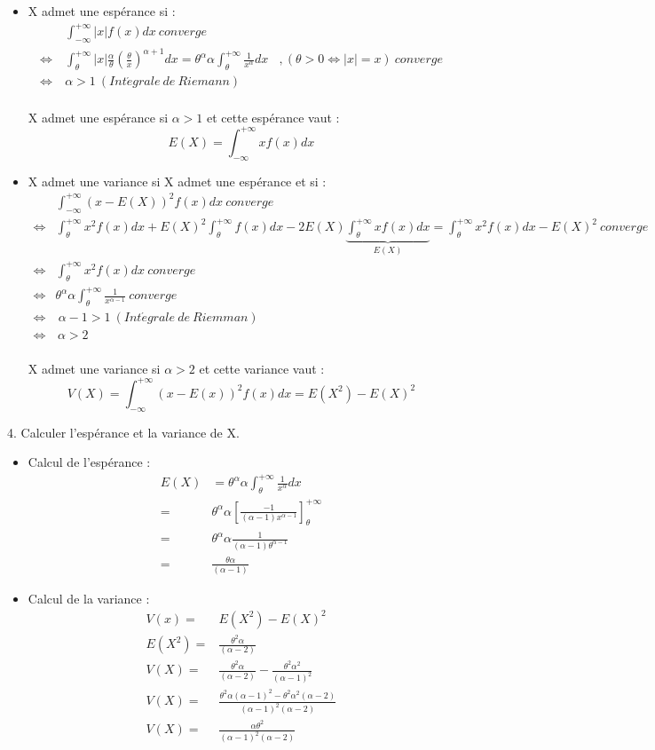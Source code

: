 \documentclass{article}
\begin{document}
\begin{itemize}
\item X admet une espérance si :
\begin{align*}
 & \int_{-\infty}^{+\infty}|x|f(x)dx\ converge\\
\Leftrightarrow & \int_{\theta}^{+\infty}|x|\frac{\alpha}{\theta}(\frac{\theta}{x})^{\alpha+1}dx=\theta^{\alpha}\alpha\int_{\theta}^{+\infty}\frac{1}{x^{\alpha}}dx\ \ \ \ ,(\theta>0\Leftrightarrow|x|=x)\ converge\\
\Leftrightarrow\  & \alpha>1\ (Int\acute{e}grale\ de\ Riemann)
\end{align*}
\\
X admet une espérance si $\alpha>1$ et cette espérance vaut :\\
\[
E(X)=\int_{-\infty}^{+\infty}xf(x)dx
\]
\item X admet une variance si X admet une espérance et si :
\begin{align*}
 & \int_{-\infty}^{+\infty}(x-E(X))^{2}f(x)dx\ converge\\
\Leftrightarrow & \int_{\theta}^{+\infty}x^{2}f(x)dx+E(X)^{2}\int_{\theta}^{+\infty}f(x)dx-2E(X)\underset{E(X)}{\underbrace{\int_{\theta}^{+\infty}xf(x)dx}}=\int_{\theta}^{+\infty}x^{2}f(x)dx-E(X)^{2}\ converge\\
\Leftrightarrow & \int_{\theta}^{+\infty}x^{2}f(x)dx\ converge\\
\Leftrightarrow & \theta^{\alpha}\alpha\int_{\theta}^{+\infty}\frac{1}{x^{\alpha-1}}\ converge\\
\Leftrightarrow & \ \alpha-1>1\ (Int\acute{e}grale\ de\ Riemman)\\
\Leftrightarrow & \,\alpha>2
\end{align*}
\\
X admet une variance si $\alpha>2$ et cette variance vaut :
\[
V(X)=\int_{-\infty}^{+\infty}(x-E(x))^{2}f(x)dx=E(X^{2})-E(X)^{2}
\]
\end{itemize}
4. Calculer l'espérance et la variance de X.
\begin{itemize}
\item Calcul de l'espérance :
\begin{align*}
E(X) & =\theta^{\alpha}\alpha\int_{\theta}^{+\infty}\frac{1}{x^{\alpha}}dx\\
= & \theta^{\alpha}\alpha[\frac{-1}{(\alpha-1)x^{\alpha-1}}]_{\theta}^{+\infty}\\
= & \theta^{\alpha}\alpha\frac{1}{(\alpha-1)\theta^{\alpha-1}}\\
= & \frac{\theta\alpha}{(\alpha-1)}
\end{align*}
\item Calcul de la variance :
\begin{align*}
V(x)= & E(X^{2})-E(X)^{2}\\
E(X^{2})= & \frac{\theta^{2}\alpha}{(\alpha-2)}\\
V(X)= & \frac{\theta^{2}\alpha}{(\alpha-2)}-\frac{\theta^{2}\alpha^{2}}{(\alpha-1)^{2}}\\
V(X)= & \frac{\theta^{2}\alpha(\alpha-1)^{2}-\theta^{2}\alpha^{2}(\alpha-2)}{(\alpha-1)^{2}(\alpha-2)}\\
V(X)= & \frac{\alpha\theta^{2}}{(\alpha-1)^{2}(\alpha-2)}
\end{align*}
\end{itemize}
\end{document}
